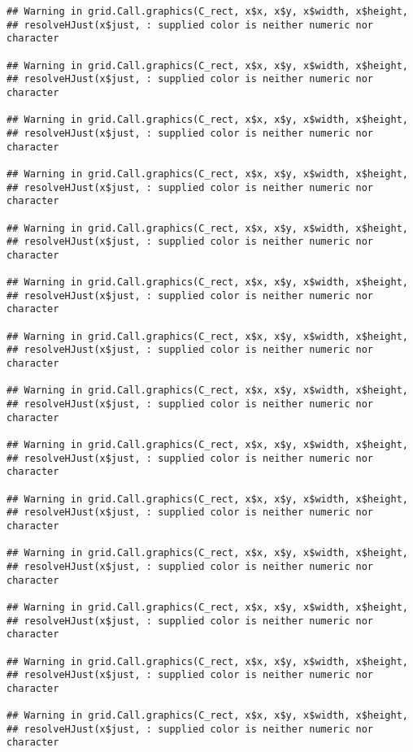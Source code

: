 \documentclass[
]{article}
\begin{document}
\begin{verbatim}
## Warning in grid.Call.graphics(C_rect, x$x, x$y, x$width, x$height,
## resolveHJust(x$just, : supplied color is neither numeric nor character

## Warning in grid.Call.graphics(C_rect, x$x, x$y, x$width, x$height,
## resolveHJust(x$just, : supplied color is neither numeric nor character

## Warning in grid.Call.graphics(C_rect, x$x, x$y, x$width, x$height,
## resolveHJust(x$just, : supplied color is neither numeric nor character

## Warning in grid.Call.graphics(C_rect, x$x, x$y, x$width, x$height,
## resolveHJust(x$just, : supplied color is neither numeric nor character

## Warning in grid.Call.graphics(C_rect, x$x, x$y, x$width, x$height,
## resolveHJust(x$just, : supplied color is neither numeric nor character

## Warning in grid.Call.graphics(C_rect, x$x, x$y, x$width, x$height,
## resolveHJust(x$just, : supplied color is neither numeric nor character

## Warning in grid.Call.graphics(C_rect, x$x, x$y, x$width, x$height,
## resolveHJust(x$just, : supplied color is neither numeric nor character

## Warning in grid.Call.graphics(C_rect, x$x, x$y, x$width, x$height,
## resolveHJust(x$just, : supplied color is neither numeric nor character

## Warning in grid.Call.graphics(C_rect, x$x, x$y, x$width, x$height,
## resolveHJust(x$just, : supplied color is neither numeric nor character

## Warning in grid.Call.graphics(C_rect, x$x, x$y, x$width, x$height,
## resolveHJust(x$just, : supplied color is neither numeric nor character

## Warning in grid.Call.graphics(C_rect, x$x, x$y, x$width, x$height,
## resolveHJust(x$just, : supplied color is neither numeric nor character

## Warning in grid.Call.graphics(C_rect, x$x, x$y, x$width, x$height,
## resolveHJust(x$just, : supplied color is neither numeric nor character

## Warning in grid.Call.graphics(C_rect, x$x, x$y, x$width, x$height,
## resolveHJust(x$just, : supplied color is neither numeric nor character

## Warning in grid.Call.graphics(C_rect, x$x, x$y, x$width, x$height,
## resolveHJust(x$just, : supplied color is neither numeric nor character


\end{verbatim}
\end{document}
